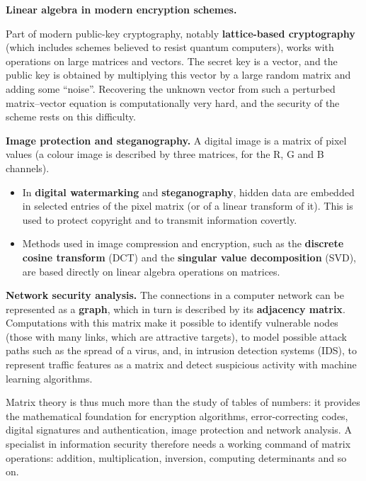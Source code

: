 \textbf{Linear algebra in modern encryption schemes.}
\begin{sloppypar}
Part of modern public-key cryptography, notably \textbf{lattice-based
cryptography} (which includes schemes believed to resist quantum computers),
works with operations on large matrices and vectors. The secret key is a vector,
and the public key is obtained by multiplying this vector by a large random matrix
and adding some “noise”. Recovering the unknown vector from such a perturbed
matrix–vector equation is computationally very hard, and the security of the
scheme rests on this difficulty.

\textbf{Image protection and steganography.}
A digital image is a matrix of pixel values (a colour image is described by three
matrices, for the R, G and B channels).
\end{sloppypar}
\begin{itemize}[leftmargin=1.3em]
\item In \textbf{digital watermarking} and \textbf{steganography}, hidden data are
embedded in selected entries of the pixel matrix (or of a linear transform of it).
This is used to protect copyright and to transmit information covertly.
\item Methods used in image compression and encryption, such as the
\textbf{discrete cosine transform} (DCT) and the \textbf{singular value
decomposition} (SVD), are based directly on linear algebra operations on matrices.
\end{itemize}
\textbf{Network security analysis.}
The connections in a computer network can be represented as a \textbf{graph},
which in turn is described by its \textbf{adjacency matrix}. Computations with
this matrix make it possible to identify vulnerable nodes (those with many links,
which are attractive targets), to model possible attack paths such as the spread
of a virus, and, in intrusion detection systems (IDS), to represent traffic
features as a matrix and detect suspicious activity with machine learning
algorithms.

Matrix theory is thus much more than the study of tables of numbers: it provides
the mathematical foundation for encryption algorithms, error-correcting codes,
digital signatures and authentication, image protection and network analysis.
A specialist in information security therefore needs a working command of matrix
operations: addition, multiplication, inversion, computing determinants and so on.

